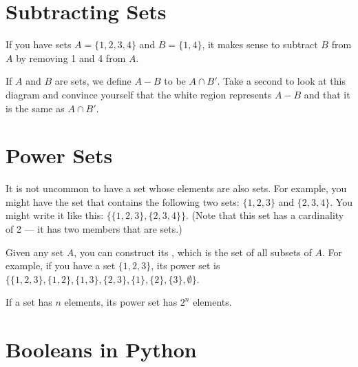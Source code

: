 
\section{Subtracting Sets}

If you have sets $A = \{1,2,3,4\}$ and $B = \{1, 4\}$, it makes sense
to subtract $B$ from $A$ by removing 1 and 4 from $A$.

If $A$ and $B$ are sets, we define $A - B$ to be $A \cap B'$.  Take a
second to look at this diagram and convince yourself that the white
region represents $A - B$ and that it is the same as $A \cap B'$.


\section{Power Sets}

It is not uncommon to have a set whose elements are also sets.  For
example, you might have the set that contains the following two sets:
$\{1,2,3\}$ and $\{2,3,4\}$. You might write it like this: $\{
\{1,2,3\}, \{2,3,4\} \}$. (Note that this set has a cardinality of 2
--- it has two members that are sets.)

Given any set $A$, you can construct its , which is
the set of all subsets of $A$.  For example, if you have a set
$\{1,2,3\}$, its power set is $\{\{1,2,3\}, \{1,2\},\{1,3\}, \{2,3\},
\{1\}, \{2\}, \{3\}, \emptyset\}$.

If a set has $n$ elements, its power set has $2^n$ elements.

\section{Booleans in Python}

